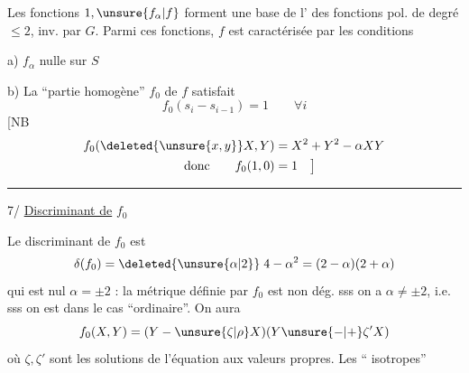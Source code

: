 Les fonctions $1,\unsure{f_\alpha|f}$ forment une base  de l' des fonctions pol. de degré $\le2$, inv. par $G$.
Parmi ces fonctions, $f$ est caractérisée par les  conditions

a) $f_\alpha$ nulle sur $S$

b) La ``partie homogène'' $f_0$ de $f$ satisfait
\[
f_0(s_i-s_{i-1})=1\qquad\forall i
\]
[NB
\[
\begin{aligned}
f_0(\deleted{\unsure{x,y}}X,Y)&=X^2+Y^2-\alpha XY\\
\text{donc}\qquad f_0(1,0)&=1\quad\big]
\end{aligned}
\]
\begin{center}\rule{1.4cm}{.35pt}\end{center}
7/  \uline{Discriminant de} $f_0$

Le discriminant de $f_0$ est
\[
\delta(f_0)=\deleted{\unsure{\alpha|2}}\;4-\alpha^2=(2-\alpha)(2+\alpha)
\]
qui est nul  $\alpha=\pm2$ : la métrique définie par $f_0$ est non dég. sss on a $\alpha\ne\pm2$, i.e. sss on est dans le cas ``ordinaire''. On aura
\[
f_0(X,Y)=(Y-\unsure{\zeta|\rho}X)(Y\unsure{-|+}\zeta'X)
\]
où $\zeta,\zeta'$ sont les solutions de l'équation aux valeurs propres. Les ``  isotropes''
